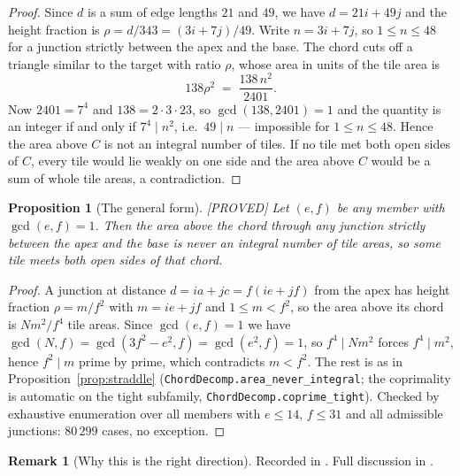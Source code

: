 \documentclass[11pt,reqno]{amsart}
\theoremstyle{plain}
\newtheorem{proposition}[theorem]{Proposition}
\theoremstyle{definition}
\newtheorem{remark}[theorem]{Remark}
\newcommand{\lab}[1]{\hfill\textnormal{\footnotesize\textsc{[#1]}}}
\begin{document}
\begin{proof}
Since $d$ is a sum of edge lengths $21$ and $49$, we have $d=21i+49j$ and the height fraction is
$\rho=d/343=(3i+7j)/49$. Write $n=3i+7j$, so $1\le n\le48$ for a junction strictly between the apex
and the base. The chord cuts off a triangle similar to the target with ratio $\rho$, whose area in
units of the tile area is
\[
138\rho^{2}\;=\;\frac{138\,n^{2}}{2401}.
\]
Now $2401=7^{4}$ and $138=2\cdot3\cdot23$, so $\gcd(138,2401)=1$ and the quantity is an integer if
and only if $7^{4}\mid n^{2}$, i.e.\ $49\mid n$ --- impossible for $1\le n\le48$. Hence the area above
$C$ is not an integral number of tiles. If no tile met both open sides of $C$, every tile would lie
weakly on one side and the area above $C$ would be a sum of whole tile areas, a contradiction.
\end{proof}

\begin{proposition}[The general form]\label{prop:straddlegen}\lab{PROVED}
Let $(e,f)$ be any member with $\gcd(e,f)=1$. Then the area above the chord through any junction
strictly between the apex and the base is never an integral number of tile areas, so some tile meets
both open sides of that chord.
\end{proposition}

\begin{proof}
A junction at distance $d=ia+jc=f(ie+jf)$ from the apex has height fraction $\rho=m/f^{2}$ with
$m=ie+jf$ and $1\le m<f^{2}$, so the area above its chord is $Nm^{2}/f^{4}$ tile areas. Since
$\gcd(e,f)=1$ we have $\gcd(N,f)=\gcd(3f^{2}-e^{2},f)=\gcd(e^{2},f)=1$, so $f^{4}\mid Nm^{2}$ forces
$f^{4}\mid m^{2}$, hence $f^{2}\mid m$ prime by prime, which contradicts $m<f^{2}$. The rest is as in
Proposition~\ref{prop:straddle} (\texttt{ChordDecomp.area\_never\_integral}; the coprimality is
automatic on the tight subfamily, \texttt{ChordDecomp.coprime\_tight}). Checked by exhaustive
enumeration over all members with $e\le14$, $f\le31$ and all admissible junctions: $80\,299$ cases,
no exception.
\end{proof}

\begin{remark}[Why this is the right direction]\label{rem:straddlescope}
Recorded in \cite{Obstructions}. Full discussion in \cite{Obstructions}.
\end{remark}
\end{document}
